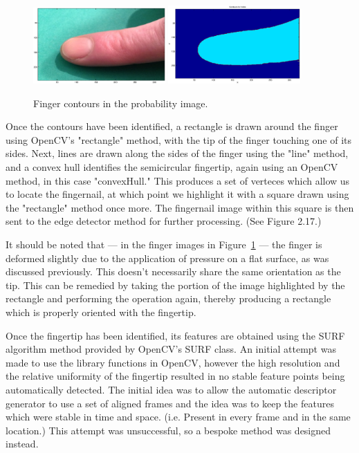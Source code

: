 \begin{figure}[h!]
  \centering
      \includegraphics[width=0.45\textwidth]{Chapter2/Figs/imgJIndex1.eps}
    \includegraphics[width=0.45\textwidth]{Chapter2/Figs/indexContours.eps}
    \caption{Finger contours in the probability image.}\label{fig:IndexContours}
\end{figure}

Once the contours have been identified, a rectangle is drawn around the finger using OpenCV's "rectangle" method, with the tip of the finger touching one of its sides. Next, lines are drawn along the sides of the finger using the "line" method, and a convex hull identifies the semicircular fingertip, again using an OpenCV method, in this case "convexHull." This produces a set of verteces which allow us to locate the fingernail, at which point we highlight it with a square drawn using the "rectangle" method once more. The fingernail image within this square is then sent to the edge detector method for further processing. (See Figure 2.17.)

It should be noted that --- in the finger images in Figure~\ref{fig:IndexContours} --- the finger is deformed slightly due to the application of pressure on a flat surface, as was discussed previously. This doesn't necessarily share the same orientation as the tip. This can be remedied by taking the portion of the image highlighted by the rectangle and performing the operation again, thereby producing a rectangle which is properly oriented with the fingertip.

Once the fingertip has been identified, its features are obtained using the SURF algorithm method provided by OpenCV's SURF class. An initial attempt was made to use the library functions in OpenCV, however the high resolution and the relative uniformity of the fingertip resulted in no stable feature points being automatically detected. The initial idea was to allow the automatic descriptor generator to use a set of aligned frames and the idea was to keep the features which were stable in time and space. (i.e. Present in every frame and in the same location.) This attempt was unsuccessful, so a bespoke method was designed instead.


